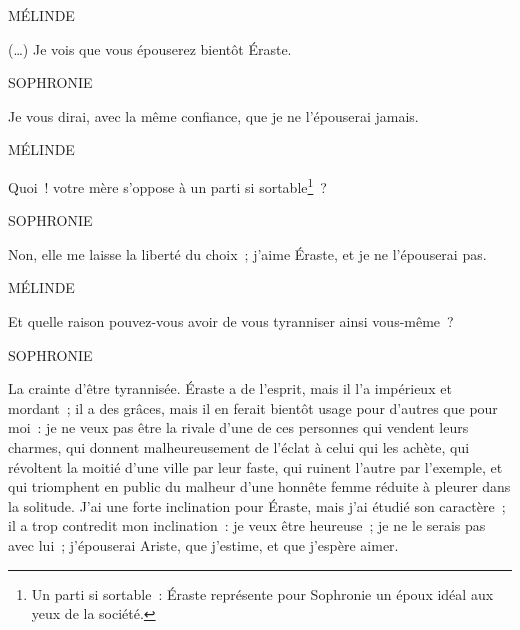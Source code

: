 
{

MÉLINDE

(…) Je vois que vous épouserez bientôt Éraste.

\medskip

SOPHRONIE

Je vous dirai, avec la même confiance, que je ne l'épouserai jamais.

\medskip

MÉLINDE

Quoi~! votre mère s'oppose à un parti si sortable\footnote{Un parti si sortable~: Éraste représente pour Sophronie un époux idéal aux yeux de la société.}~?

\medskip

SOPHRONIE

Non, elle me laisse la liberté du choix~; j'aime Éraste, et je ne l'épouserai pas.

\medskip

MÉLINDE

Et quelle raison pouvez-vous avoir de vous tyranniser ainsi vous-même~?

\medskip

SOPHRONIE

La crainte d'être tyrannisée. Éraste a de l'esprit, mais il l'a impérieux et mordant~; il a des grâces, mais il en ferait bientôt usage pour d'autres que pour moi~: je ne veux pas être la rivale d'une de ces personnes qui vendent leurs charmes, qui donnent malheureusement de l'éclat à celui qui les achète, qui révoltent la moitié d'une ville par leur faste, qui ruinent l'autre par l'exemple, et qui triomphent en public du malheur d'une honnête femme réduite à pleurer dans la solitude. J'ai une forte inclination pour Éraste, mais j'ai étudié son caractère~; il a trop contredit mon inclination~: je veux être heureuse~; je ne le serais pas avec lui~; j'épouserai Ariste, que j'estime, et que j'espère aimer.

}
